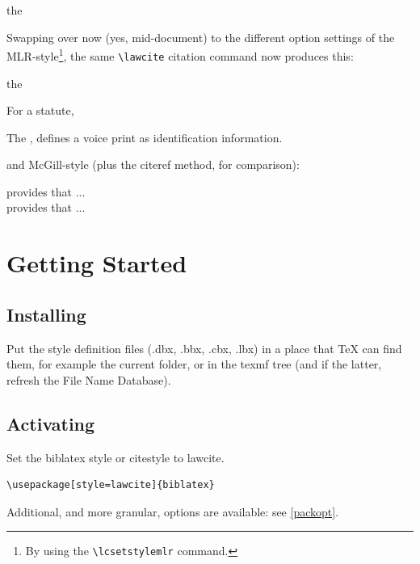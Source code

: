\begin{mdframed}[default]
the 
\end{mdframed}
\bigskip
Swapping over now (yes, mid-document) to the different option settings of the MLR-style\footnote{By using the \texttt{\textbackslash lcsetstylemlr} command.}, the same \texttt{\textbackslash lawcite} citation command now produces this:

\lcsetstylemlr
\begin{mdframed}[default]
the  
\end{mdframed}
\bigskip
\lcsetstyledefault

For a statute, 

\begin{mdframed}[default]
The , defines a voice print as identification information.
\end{mdframed}
\bigskip

and McGill-style (plus the citeref method, for comparison): \lcsetstylemcgill

\begin{mdframed}[default]
 provides that ...\\
 provides that ...
\end{mdframed}
\bigskip

\lcsetstyledefault

\section{Getting Started}
\subsection{Installing}
Put the style definition files (.dbx, .bbx, .cbx, .lbx) in a place that TeX can find them, for example the current folder, or in the texmf tree (and if the latter, refresh the File Name Database).

\subsection{Activating}
Set the biblatex style or citestyle to lawcite.

\begin{verbatim}
\usepackage[style=lawcite]{biblatex}
\end{verbatim}
Additional, and more granular, options are available: see \autoref{packopt}.



